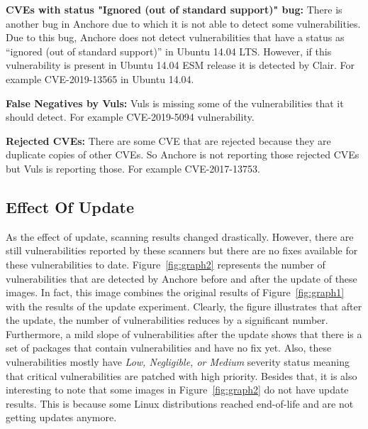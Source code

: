 \documentclass[a4paper,num-refs]{oup-contemporary}
\begin{document}
\textbf{CVEs with status "Ignored (out of standard support)" bug:} There is another bug in Anchore due to 
		which it is not able to detect some vulnerabilities. Due to this bug, Anchore does not detect 
		vulnerabilities that have a status as “ignored (out of standard support)” in Ubuntu 14.04 LTS. 
		However, if this vulnerability is present in Ubuntu 14.04 ESM release it is detected by Clair. 
		For example CVE-2019-13565 in Ubuntu 14.04.


\textbf{False Negatives by Vuls:} Vuls is missing some of the vulnerabilities that it should detect. 
		For example CVE-2019-5094 vulnerability.

\textbf{Rejected CVEs:} There are some CVE that are rejected because they are duplicate copies of other CVEs. 
	So Anchore is not reporting those rejected CVEs but Vuls is reporting those. For example CVE-2017-13753.


\subsection{Effect Of Update}

As the effect of update,
scanning results changed drastically. However, there are still
vulnerabilities reported by these scanners but there are no fixes available for these vulnerabilities
to date.
Figure~\ref{fig:graph2} represents the number of vulnerabilities that are detected by Anchore before and after 
the update of these images. 
In fact, this image combines the original results of Figure~\ref{fig:graph1} with the results of the update
experiment.
Clearly, the figure illustrates that after the update, the number of vulnerabilities reduces by a
significant number. Furthermore, a mild slope of vulnerabilities after the update shows that
there is a set of packages that contain vulnerabilities and have no fix yet. Also, these
vulnerabilities mostly have \textit{Low, Negligible, or Medium} severity status meaning that
critical vulnerabilities are patched with high priority.
Besides that, it is also interesting to note that some images in Figure~\ref{fig:graph2}
do not have update results. This is because some Linux distributions reached end-of-life and
are not getting updates anymore.
\end{document}
